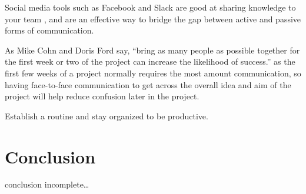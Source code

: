 \documentclass{scrartcl}
\begin{document}
Social media tools such as Facebook and Slack are good at sharing knowledge to your team \cite{Agile-on-the-beach-cite}, and are an effective way to bridge the gap between active and passive forms of communication.

As Mike Cohn and Doris Ford say, ``bring as many people as possible together for the first week or two of the project can increase the likelihood of success.'' \cite{cohn2003} as the first few weeks of a project normally requires the most amount communication, so having face-to-face communication to get across the overall idea and aim of the project will help reduce confusion later in the project.

Establish a routine and stay organized to be productive. \cite{Agile-on-the-beach-cite}

\section{Conclusion}

conclusion incomplete\ldots




\end{document}
